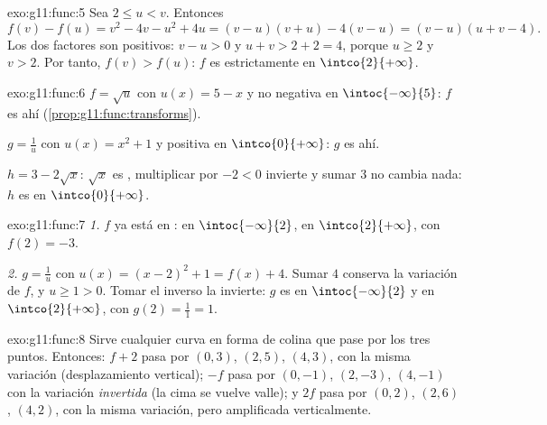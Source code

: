 \begin{solution}{exo:g11:func:5}
Sea $2 \leq u < v$. Entonces
\[
f(v) - f(u) = v^2 - 4v - u^2 + 4u = (v-u)(v+u) - 4(v-u)
= (v - u)(u + v - 4).
\]
Los dos factores son positivos: $v - u > 0$ y $u + v > 2 + 2 = 4$, porque
$u \geq 2$ y $v > 2$. Por tanto, $f(v) > f(u)$: $f$ es estrictamente
 en $\intco{2}{+\infty}$.
\end{solution}

\begin{solution}{exo:g11:func:6}
$f = \sqrt{u}$ con $u(x) = 5 - x$  y no negativa en
$\intoc{-\infty}{5}$: $f$ es  ahí
(\cref{prop:g11:func:transforms}).

$g = \frac1u$ con $u(x) = x^2 + 1$  y positiva en
$\intco{0}{+\infty}$: $g$ es  ahí.

$h = 3 - 2\sqrt x$: $\sqrt x$ es , multiplicar por $-2 < 0$
invierte y sumar $3$ no cambia nada: $h$ es  en
$\intco{0}{+\infty}$.
\end{solution}

\begin{solution}{exo:g11:func:7}
\emph{1.} $f$ ya está en :  en
$\intoc{-\infty}{2}$,  en $\intco{2}{+\infty}$, con 
$f(2) = -3$.

\emph{2.} $g = \frac{1}{u}$ con $u(x) = (x-2)^2 + 1 = f(x) + 4$. Sumar $4$
conserva la variación de $f$, y $u \geq 1 > 0$. Tomar el inverso la
invierte: $g$ es  en $\intoc{-\infty}{2}$ y  en
$\intco{2}{+\infty}$, con  $g(2) = \frac{1}{1} = 1$.
\end{solution}

\begin{solution}{exo:g11:func:8}
Sirve cualquier curva en forma de colina que pase por los tres puntos.
Entonces: $f + 2$ pasa por $(0,3)$, $(2,5)$, $(4,3)$, con la misma
variación (desplazamiento vertical); $-f$ pasa por $(0,-1)$, $(2,-3)$,
$(4,-1)$ con la variación \emph{invertida} (la cima se vuelve valle); y
$2f$ pasa por $(0,2)$, $(2,6)$, $(4,2)$, con la misma variación, pero
amplificada verticalmente.
\end{solution}

